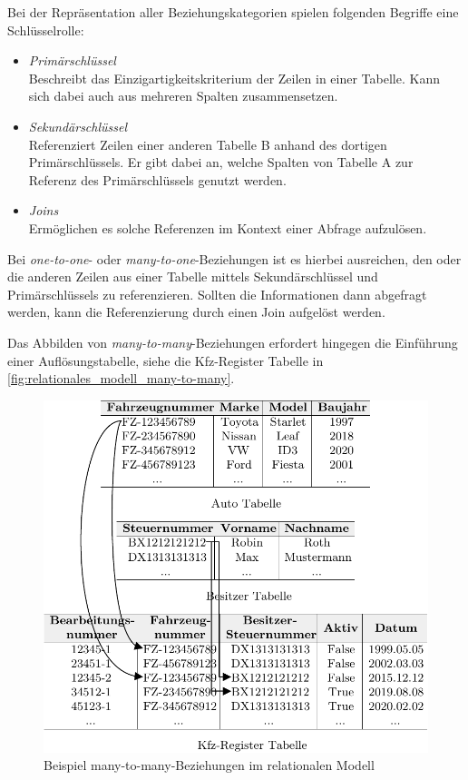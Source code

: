 Bei der Repräsentation aller Beziehungskategorien spielen  folgenden Begriffe eine Schlüsselrolle:
\begin{itemize}
    \item \textit{Primärschlüssel}\\
    Beschreibt das Einzigartigkeitskriterium der Zeilen in einer Tabelle. Kann sich dabei auch aus mehreren Spalten zusammensetzen. 
    \item \textit{Sekundärschlüssel}\\
    Referenziert Zeilen einer anderen Tabelle B anhand des dortigen Primärschlüssels. Er gibt dabei an, welche Spalten von Tabelle A zur Referenz des Primärschlüssels genutzt werden. 
    \item \textit{Joins}\\
    Ermöglichen es solche Referenzen im Kontext einer Abfrage aufzulösen.
\end{itemize}

Bei \textit{one-to-one}- oder \textit{many-to-one}-Beziehungen ist es hierbei ausreichen, den oder die anderen Zeilen aus einer Tabelle mittels Sekundärschlüssel und Primärschlüssels zu referenzieren. Sollten die Informationen dann abgefragt werden, kann die Referenzierung durch einen Join aufgelöst werden.

Das Abbilden von \textit{many-to-many}-Beziehungen erfordert hingegen die Einführung einer Auflösungstabelle, siehe die Kfz-Register Tabelle in \autoref{fig:relationales_modell_many-to-many}. 

\begin{figure}[h]
    \centering
    \includegraphics[width=\textwidth]{images/many-to-many.pdf}
    \caption{Beispiel many-to-many-Beziehungen im relationalen Modell}
    \label{fig:relationales_modell_many-to-many}
\end{figure}

